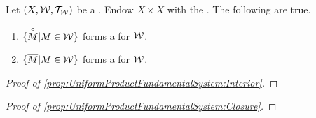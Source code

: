\begin{prop}
\label{prop:UniformProductFundamentalSystem}
    Let $(X,\mathcal{W}, \mathcal{T}_{\mathcal{W}})$ be a \UniformSpace. 
    Endow $X \times X$ with the \ProductTopology.
    The following are true. 
    \begin{enumerate}[label=(\roman*), ref={\ref{prop:UniformProductFundamentalSystem}~\roman*}]
        \item 
        \label{prop:UniformProductFundamentalSystem:Interior}
        $\{\overset{\circ}{M} | M \in \mathcal{W}\}$
        forms a 
        \FundamentalSystemOfEntourages
        for $\mathcal{W}$.
        \item 
        \label{prop:UniformProductFundamentalSystem:Closure}
        $\{\overline{M} | M \in \mathcal{W}\}$
        forms a 
        \FundamentalSystemOfEntourages
        for $\mathcal{W}$.
    \end{enumerate}
    \begin{proof}[Proof of \ref{prop:UniformProductFundamentalSystem:Interior}]

    \end{proof}
    \begin{proof}[Proof of \ref{prop:UniformProductFundamentalSystem:Closure}]
    \end{proof}
\end{prop}
